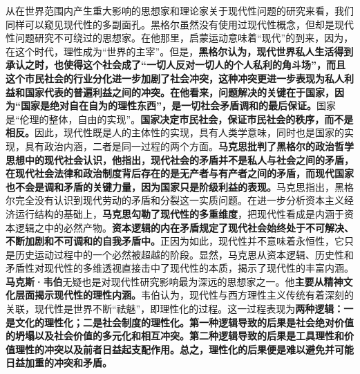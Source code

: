 \documentclass[UTF8, fontset = sourcesans, a4paper, oneside, zihao =
-4, scheme=chinese, no-math, space=true]{ctexbook}
\begin{document}
从在世界范围内产生重大影响的思想家和理论家关于现代性问题的研究来看，我们同样可以窥见现代性的多副面孔。黑格尔虽然没有使用过现代性概念，但却是现代性问题研究不可绕过的思想家。在他那里，启蒙运动意味着``现代''的到来，因为，在这个时代，理性成为``世界的主宰''。但是，\textbf{黑格尔认为，现代世界私人生活得到承认之时，也使得这个社会成了``一切人反对一切人的个人私利的角斗场''，而且这个市民社会的行业分化进一步加剧了社会冲突，这种冲突更进一步表现为私人利益和国家代表的普遍利益之间的冲突。在他看来，问题解决的关键在于国家，因为``国家是绝对自在自为的理性东西''，是一切社会矛盾调和的最后保证。}国家是``伦理的整体，自由的实现''。\textbf{国家决定市民社会，保证市民社会的秩序，而不是相反。}因此，现代性既是人的主体性的实现，具有人类学意味，同时也是国家的实现，具有政治内涵，二者是同一过程的两个方面。\textbf{马克思批判了黑格尔的政治哲学思想中的现代社会认识，他指出，现代社会的矛盾并不是私人与社会之间的矛盾，在现代社会法律和政治制度背后存在的是无产者与有产者之间的矛盾，而现代国家也不会是调和矛盾的关键力量，因为国家只是阶级利益的表现。}马克思指出，黑格尔完全没有认识到现代劳动的矛盾和分裂这一实质问题。在进一步分析资本主义经济运行结构的基础上，\textbf{马克思勾勒了现代性的多重维度}，把现代性看成是内涵于资本逻辑之中的必然产物。\textbf{资本逻辑的内在矛盾规定了现代社会始终处于不可解决、不断加剧和不可调和的自我矛盾中。}正因为如此，现代性并不意味着永恒性，它只是历史运动过程中的一个必然被超越的阶段。显然，马克思从资本逻辑、历史性和矛盾性对现代性的多维透视直接击中了现代性的本质，揭示了现代性的丰富内涵。\textbf{马克斯·韦伯}无疑也是对现代性研究影响最为深远的思想家之一。他\textbf{主要从精神文化层面揭示现代性的理性内涵。}韦伯认为，现代性与西方理性主义传统有着深刻的关联，现代性是世界不断``祛魅''，即理性化的过程。这一过程表现为\textbf{两种逻辑：一是文化的理性化；二是社会制度的理性化。第一种逻辑导致的后果是社会绝对价值的坍塌以及社会价值的多元化和相互冲突。第二种逻辑导致的后果是工具理性和价值理性的冲突以及前者日益起支配作用。总之，理性化的后果便是难以避免并可能日益加重的冲突和矛盾。}
\end{document}
